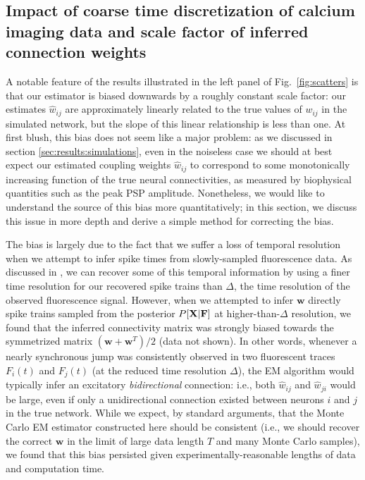 \documentclass[aoas,preprint]{imsart}
\newcommand{\w}{w}
\newcommand{\bw}{\mathbf{\w}}
\newcommand{\bF}{{\bf F}}
\newcommand{\bX}{{\bf X}}
\begin{document}
\subsection{Impact of coarse time discretization of calcium imaging
  data and scale factor of inferred connection weights}
\label{sec:scale}

A notable feature of the results illustrated in the left panel of
Fig.~\ref{fig:scatters} is that our estimator is biased downwards by a
roughly constant scale factor: our estimates $\hat w_{ij}$ are
approximately linearly related to the true values of $w_{ij}$ in the
simulated network, but the slope of this linear relationship is less
than one.  At first blush, this bias does not seem like a major
problem: as we discussed in section \ref{sec:results:simulations},
even in the noiseless case we should at best expect our estimated
coupling weights $\hat w_{ij}$ to correspond to some monotonically
increasing function of the true neural connectivities, as measured by
biophysical quantities such as the peak PSP amplitude.  Nonetheless,
we would like to understand the source of this bias more
quantitatively; in this section, we discuss this issue in more depth
and derive a simple method for correcting the bias.

The bias is largely due to the fact that we suffer a loss of temporal
resolution when we attempt to infer spike times from slowly-sampled
fluorescence data.  As discussed in \cite{Vogelstein2009}, we can
recover some of this temporal information by using a finer time
resolution for our recovered spike trains than $\Delta$, the time
resolution of the observed fluorescence signal.  However, when we
attempted to infer $\bw$ directly spike trains sampled from the
posterior $P[\bX|\bF]$ at higher-than-$\Delta$ resolution, we found
that the inferred connectivity matrix was strongly biased towards the
symmetrized matrix $(\bw+\bw^T)/2$ (data not shown).  In other words,
whenever a nearly synchronous jump was consistently observed in two
fluorescent traces $F_i(t)$ and $F_j(t)$ (at the reduced time
resolution $\Delta$), the EM algorithm would typically infer an
excitatory \emph{bidirectional} connection: i.e., both $\hat w_{ij}$
and $\hat w_{ji}$ would be large, even if only a unidirectional
connection existed between neurons $i$ and $j$ in the true network.
While we expect, by standard arguments, that the Monte Carlo EM
estimator constructed here should be consistent (i.e., we should
recover the correct $\bw$ in the limit of large data length $T$ and
many Monte Carlo samples), we found that this bias persisted given
experimentally-reasonable lengths of data and computation time.
\end{document}
